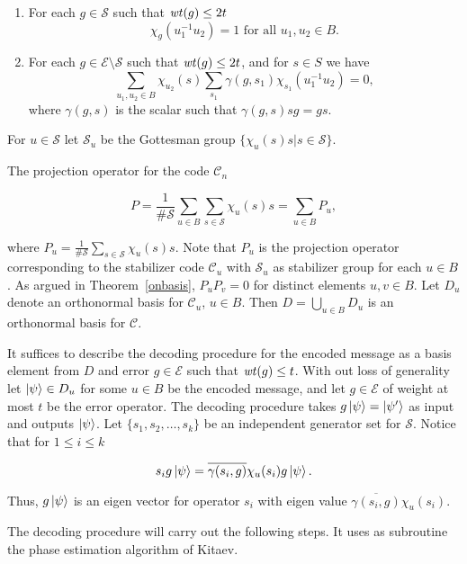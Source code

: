 \documentclass{Rinton-P9x6}
\newcommand {\ket} [1] {\ensuremath \left\vert#1\ensuremath \right\rangle}
\newcommand{\wt}{{\it wt}}
\newcommand{\C}{{\ensuremath{\mathcal{C}}}}
\renewcommand{\S}{{\ensuremath{\mathcal{S}}}}
\newcommand{\E}{{\ensuremath{\mathcal{E}}}}
\begin{document}
\begin{enumerate}
  
\item 
For each $g \in \S$ such that $\wt(g)\leq 2t$
\[
\chi_g( u_1^{-1} u_2) = 1 \textrm{ for all } u_1,u_2 \in B. 
\]

\item 
For each $g \in \E \setminus \S$ such that $\wt(g)\leq 2t$, and for 
$s\in S$ we have
\[
\sum_{u_1,u_2 \in B} \chi_{u_2}(s) \sum_{s_1 }\gamma(g,s_1)
\chi_{s_1} (u_1^{-1} u_2 ) = 0,
\]
where $\gamma(g,s)$ is the scalar such that $\gamma(g,s) s g = gs$.
\end{enumerate}

For $u \in \S$ let $\S_u$ be the Gottesman group $\{ \chi_u(s) s | s \in
\S\}$. 

The projection operator for the code $\C_n$

\[
P = \frac{1}{\#\S} \sum_{u \in B} \sum_{s \in \S} \chi_u(s) s = \sum_{u
  \in B} P_u,
\] 

where $P_u = \frac{1}{\#\S} \sum_{s \in \S} \chi_u(s) s$. Note that
$P_u$ is the projection operator corresponding to the stabilizer code
$\C_u$ with $\S_u$ as stabilizer group for each $u\in B$. As argued in
Theorem~\ref{onbasis}, $P_uP_v=0$ for distinct elements $u,v\in B$. Let
$D_u$ denote an orthonormal basis for $\C_u$, $u\in B$. Then
$D=\bigcup_{u\in B} D_u$ is an orthonormal basis for $\C$.

It suffices to describe the decoding procedure for the encoded message
as a basis element from $D$ and error $g\in\E$ such that $\wt(g)\leq
t$. With out loss of generality let $\ket{\psi}\in D_u$ for some
$u\in B$ be the encoded message, and let $g\in\E$ of weight at most
$t$ be the error operator.  The decoding procedure takes
$g\ket{\psi}=\ket{\psi'}$ as input and outputs $\ket{\psi}$. Let
$\{s_1,s_2,\ldots,s_k\}$ be an independent generator set for $\S$.
Notice that for $1\leq i\leq k$

\[
s_ig\ket{\psi}=\overline{\gamma(s_i,g)}\chi_u(s_i)g\ket{\psi}.
\]

Thus, $g\ket{\psi}$ is an eigen vector for operator $s_i$ with eigen
value $\overline{\gamma(s_i,g)}\chi_u(s_i)$.

The decoding procedure will carry out the following steps. It uses as
subroutine the phase estimation algorithm of Kitaev\cite{NC99}.
\end{document}
